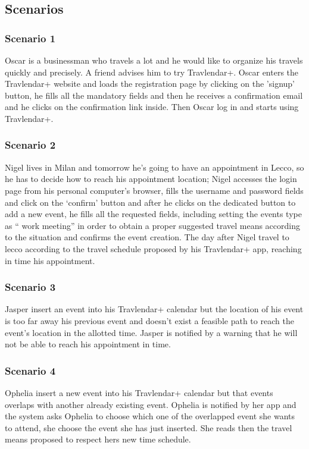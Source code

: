 \subsection{Scenarios}
\label{subsect:Scenarios}
	\subsubsection{Scenario 1}
		Oscar is a businessman who travels a lot and he would like to organize his travels quickly and precisely. A friend advises him to try Travlendar+. Oscar enters the Travlendar+ website and loads the registration page by clicking on the 'signup' button, he fills all the mandatory fields and then he receives a confirmation email and he clicks on the confirmation link inside.
Then Oscar log in and starts using Travlendar+.
	\subsubsection{Scenario 2}
		Nigel lives in Milan and tomorrow he’s going to have an appointment in Lecco, so he has to decide how to reach his appointment location; Nigel accesses the login page from his personal computer’s browser, fills the username and password fields and click on the ‘confirm’ button and after he clicks on the dedicated button to add a new event, he fills all the requested fields, including setting the events type as “ work meeting” in order to obtain a proper suggested travel means according to the situation and confirms the event creation. The day after Nigel travel to lecco according to the travel schedule proposed by his Travlendar+ app, reaching in time his appointment.

	\subsubsection{Scenario 3}
		Jasper insert an event into his Travlendar+ calendar but the location of his event is too far away his previous event and doesn’t exist a feasible path to reach the event’s location in the allotted time. Jasper is notified by a warning that he will not be able to reach his appointment in time.	
	\subsubsection{Scenario 4}
		Ophelia insert a new event into his Travlendar+ calendar but that events overlaps with another already existing event. Ophelia is notified by her app and the system asks Ophelia to choose which one of the overlapped event she wants to attend, she choose the event she has just inserted. She reads then the travel means proposed to respect hers new time schedule.
